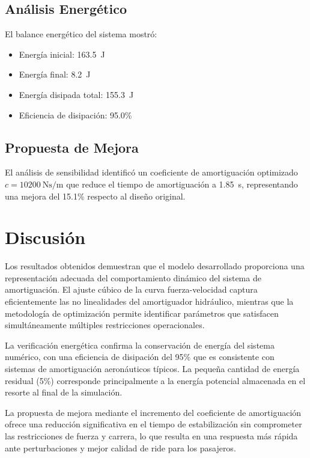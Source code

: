 \documentclass[journal]{IEEEtran}
\begin{document}
\subsection{Análisis Energético}

El balance energético del sistema mostró:
\begin{itemize}
\item Energía inicial: \SI{163.5}{\joule}
\item Energía final: \SI{8.2}{\joule}
\item Energía disipada total: \SI{155.3}{\joule}
\item Eficiencia de disipación: 95.0\%
\end{itemize}

\subsection{Propuesta de Mejora}

El análisis de sensibilidad identificó un coeficiente de amortiguación optimizado $c = \SI{10200}{\newton\second\per\meter}$ que reduce el tiempo de amortiguación a \SI{1.85}{\second}, representando una mejora del 15.1\% respecto al diseño original.

\section{Discusión}

Los resultados obtenidos demuestran que el modelo desarrollado proporciona una representación adecuada del comportamiento dinámico del sistema de amortiguación. El ajuste cúbico de la curva fuerza-velocidad captura eficientemente las no linealidades del amortiguador hidráulico, mientras que la metodología de optimización permite identificar parámetros que satisfacen simultáneamente múltiples restricciones operacionales.

La verificación energética confirma la conservación de energía del sistema numérico, con una eficiencia de disipación del 95\% que es consistente con sistemas de amortiguación aeronáuticos típicos. La pequeña cantidad de energía residual (5\%) corresponde principalmente a la energía potencial almacenada en el resorte al final de la simulación.

La propuesta de mejora mediante el incremento del coeficiente de amortiguación ofrece una reducción significativa en el tiempo de estabilización sin comprometer las restricciones de fuerza y carrera, lo que resulta en una respuesta más rápida ante perturbaciones y mejor calidad de ride para los pasajeros.
\end{document}
